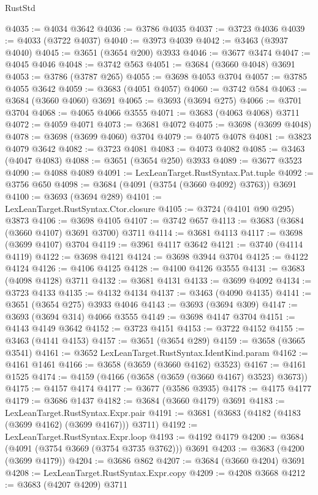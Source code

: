 \begin{lexlean}{RustStd}
\begin{coremodule}
{\begin{coremodule}
{{{{{{{{{{{{{{{{{{{{{{{{{{{{{{{{{{{{{{{{{{{{{{{@4035 := @4034 @3642
@4036 := @3786 @4035
@4037 := @3723 @4036
@4039 := @4033 (@3722 @4037)
@4040 := @3973 @4039
@4042 := @3463 (@3937 @4040)
@4045 := @3651 (@3654 @200) @3933
@4046 := @3677 @3474
@4047 := @4045 @4046
@4048 := @3742 @563
@4051 := @3684 (@3660 @4048) @3691
@4053 := @3786 (@3787 @265)
@4055 := @3698 @4053 @3704
@4057 := @3785 @4055 @3642
@4059 := @3683 (@4051 @4057)
@4060 := @3742 @584
@4063 := @3684 (@3660 @4060) @3691
@4065 := @3693 (@3694 @275)
@4066 := @3701 @3704
@4068 := @4065 @4066 @3555
@4071 := @3683 (@4063 @4068) @3711
@4072 := @4059 @4071
@4073 := @3681 @4072
@4075 := @3698 (@3699 @4048)
@4078 := @3698 (@3699 @4060) @3704
@4079 := @4075 @4078
@4081 := @3823 @4079 @3642
@4082 := @3723 @4081
@4083 := @4073 @4082
@4085 := @3463 (@4047 @4083)
@4088 := @3651 (@3654 @250) @3933
@4089 := @3677 @3523
@4090 := @4088 @4089
@4091 := LexLeanTarget.RustSyntax.Pat.tuple
@4092 := @3756 @650
@4098 := @3684 (@4091 (@3754 (@3660 @4092) @3763)) @3691
@4100 := @3693 (@3694 @289)
@4101 := LexLeanTarget.RustSyntax.Ctor.closure
@4105 := @3724 (@4101 @90 @295) @3873
@4106 := @3698 @4105
@4107 := @3742 @657
@4113 := @3683 (@3684 (@3660 @4107) @3691 @3700) @3711
@4114 := @3681 @4113
@4117 := @3698 (@3699 @4107) @3704
@4119 := @3961 @4117 @3642
@4121 := @3740 (@4114 @4119)
@4122 := @3698 @4121
@4124 := @3698 @3944 @3704
@4125 := @4122 @4124
@4126 := @4106 @4125
@4128 := @4100 @4126 @3555
@4131 := @3683 (@4098 @4128) @3711
@4132 := @3681 @4131
@4133 := @3699 @4092
@4134 := @3723 @4133
@4135 := @4132 @4134
@4137 := @3463 (@4090 @4135)
@4141 := @3651 (@3654 @275) @3933 @4046
@4143 := @3693 (@3694 @309)
@4147 := @3693 (@3694 @314) @4066 @3555
@4149 := @3698 @4147 @3704
@4151 := @4143 @4149 @3642
@4152 := @3723 @4151
@4153 := @3722 @4152
@4155 := @3463 (@4141 @4153)
@4157 := @3651 (@3654 @289)
@4159 := @3658 (@3665 @3541)
@4161 := @3652 LexLeanTarget.RustSyntax.IdentKind.param
@4162 := @4161 @1461
@4166 := @3658 (@3659 (@3660 @4162) @3523)
@4167 := @4161 @1525
@4174 := @4159 (@4166 (@3658 (@3659 (@3660 @4167) @3523) @3673))
@4175 := @4157 @4174
@4177 := @3677 (@3586 @3935)
@4178 := @4175 @4177
@4179 := @3686 @1437
@4182 := @3684 (@3660 @4179) @3691
@4183 := LexLeanTarget.RustSyntax.Expr.pair
@4191 := @3681 (@3683 (@4182 (@4183 (@3699 @4162) (@3699 @4167))) @3711)
@4192 := LexLeanTarget.RustSyntax.Expr.loop
@4193 := @4192 @4179
@4200 := @3684 (@4091 (@3754 @3669 (@3754 @3735 @3762))) @3691
@4203 := @3683 (@4200 (@3699 @4179))
@4204 := @3686 @862
@4207 := @3684 (@3660 @4204) @3691
@4208 := LexLeanTarget.RustSyntax.Expr.copy
@4209 := @4208 @3668
@4212 := @3683 (@4207 @4209) @3711
}}}}}}}}}}}}}}}}}}}}}}}}}}}}}}}}}}}}}}}}}}}}}}}
\end{coremodule}}
\end{coremodule}
\end{lexlean}
